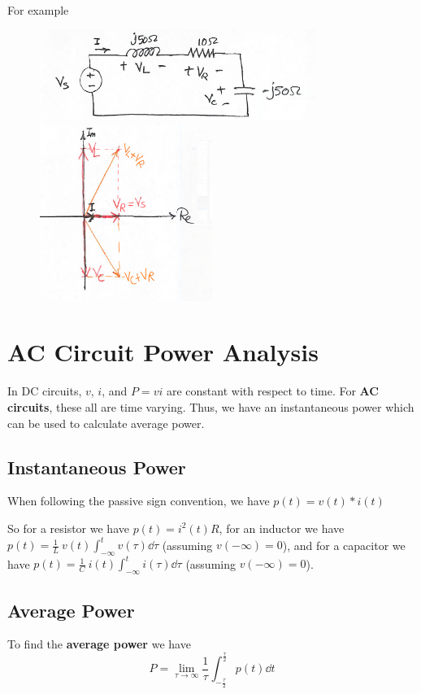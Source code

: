 \documentclass[12pt]{article}
\begin{document}
For example
\begin{figure}[ht]
\centering
\includegraphics[width=0.8\textwidth]{samplecircuit.png}
\includegraphics[width=0.5\textwidth]{samplecircuitsolved.png}
\end{figure}

\section*{AC Circuit Power Analysis}
In DC circuits, $v$, $i$, and $P = vi$ are constant with respect to time. For {\bf AC circuits}, these all are time varying. Thus, we have an instantaneous power which can be used to calculate average power.

\subsection*{Instantaneous Power}
When following the passive sign convention, we have $p(t) = v(t) * i(t)$

So for a resistor we have $p(t) = i^2(t)R$, for an inductor we have $p(t) = \frac{1}{L}\ v(t)\int_{-\infty}^t v(\tau) \dd\tau$ (assuming $v(-\infty) = 0$), and for a capacitor we have $p(t) = \frac{1}{C}\ i(t)\int_{-\infty}^t i(\tau) \dd\tau$ (assuming $v(-\infty) = 0$).

\subsection*{Average Power}
To find the {\bf average power} we have \[ P = \lim_{\tau\to\infty} \frac{1}{\tau} \int_{-\frac{\tau}{2}}^{\frac{\tau}{2}} p(t) \dd t \]
\end{document}
